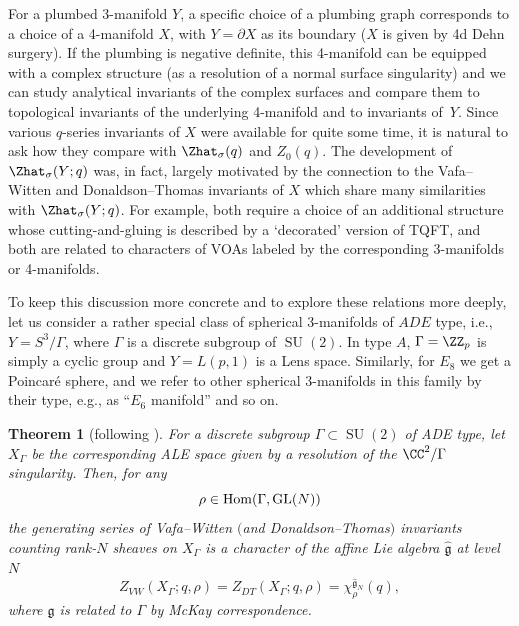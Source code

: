 \documentclass[pdftex]{sigma}
\newtheorem{Theorem}{Theorem}[section]
\begin{document}
For a plumbed 3-manifold $Y$, a specific choice of a plumbing graph corresponds to a choice of a 4-manifold $X$, with $Y = \partial X$ as its boundary ($X$ is given by 4d Dehn surgery). If the plumbing is negative definite, this 4-manifold can be equipped with a complex structure (as a resolution of a normal surface singularity) and we can study analytical invariants of the complex surfaces and compare them to topological invariants of the underlying 4-manifold and to invariants of~$Y$. Since various $q$-series invariants of $X$ were available for quite some time, it is natural to ask how they compare with $\Zhat_{\sigma} (q)$ and $Z_0 (q)$. The development of $\Zhat_{\sigma} (Y;q)$ was, in fact, largely motivated \cite{GPV16} by the connection to the Vafa--Witten and Donaldson--Thomas invariants of $X$ which share many similarities with $\Zhat_{\sigma} (Y;q)$. For example, both require a choice of an additional structure whose cutting-and-gluing is described by a `decorated' version of TQFT, and both are related to characters of VOAs labeled by the corresponding 3-manifolds or 4-manifolds.

To keep this discussion more concrete and to explore these relations more deeply, let us consider a rather special class of spherical 3-manifolds of $ADE$ type, i.e., $Y = S^3 / \Gamma$, where $\Gamma$ is a discrete subgroup of $\operatorname{SU}(2)$. In type $A$, $\Gamma = \ZZ_p$ is simply a cyclic group and $Y = L(p, 1)$ is a Lens space. Similarly, for $E_8$ we get a Poincar\'e sphere, and we refer to other spherical 3-manifolds in this family by their type, e.g., as ``$E_6$ manifold'' and so on.

\begin{Theorem}[following \cite{Nak94}]\label{theorem:ALE}
	For a discrete subgroup $\Gamma \subset \operatorname{SU}(2)$ of ADE type, let $X_{\Gamma}$ be the corresponding ALE space given by a resolution of the $\CC^2 / \Gamma$ singularity. Then, for any
\[\rho \in \operatorname{Hom} ( \Gamma , {\rm GL}(N) )
\]
	the generating series of Vafa--Witten $($and Donaldson--Thomas$)$ invariants counting rank-$N$ sheaves on $X_{\Gamma}$ is a character of the affine Lie algebra $\widehat{\mathfrak{g}}$ at level $N$
	\[
		Z_{VW} (X_{\Gamma}; q, \rho) =
		Z_{DT} (X_{\Gamma}; q, \rho) =
		\chi_{\rho}^{\widehat{\mathfrak{g}}_N} (q),
	\]
	where $\mathfrak{g}$ is related to $\Gamma$ by McKay correspondence.
\end{Theorem}
\end{document}
